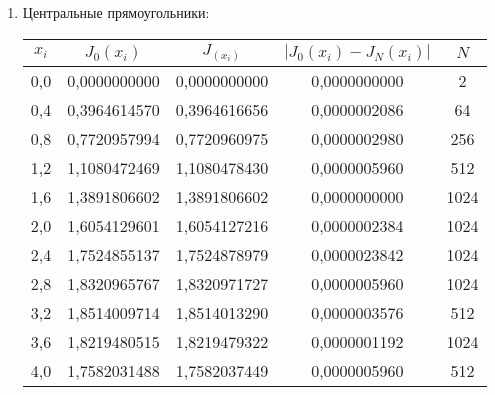 \documentclass[a4paper,12pt]{article}
\begin{document}
{\begin{enumerate}[label = \arabic*.]
{\begin{table}[h]
\begin{tabular}{|c|c|c|c|c|}
          \end{tabular}
          \caption*{\small{Таблица 2 - таблица значений для формулы правых прямоугольников}}
        \end{table}
    }
    \item {Центральные прямоугольники:
        \begin{table}[h]
          \centering
          \begin{tabular}{|c|c|c|c|c|}
            \hline
            $x_i$ & $J_0(x_i)$ & $J_(x_i)$ & $\left|J_0(x_i) - J_N(x_i)\right|$ & $N$\\
            \hline
            0,0 & 0,0000000000 & 0,0000000000 & 0,0000000000 & 2 \\
            \hline
            0,4 & 0,3964614570 & 0,3964616656 & 0,0000002086 & 64 \\
            \hline
            0,8 & 0,7720957994 & 0,7720960975 & 0,0000002980 & 256 \\
            \hline
            1,2 & 1,1080472469 & 1,1080478430 & 0,0000005960 & 512 \\
            \hline
            1,6 & 1,3891806602 & 1,3891806602 & 0,0000000000 & 1024 \\
            \hline
            2,0 & 1,6054129601 & 1,6054127216 & 0,0000002384 & 1024 \\
            \hline
            2,4 & 1,7524855137 & 1,7524878979 & 0,0000023842 & 1024 \\
            \hline
            2,8 & 1,8320965767 & 1,8320971727 & 0,0000005960 & 1024 \\
            \hline
            3,2 & 1,8514009714 & 1,8514013290 & 0,0000003576 & 512 \\
            \hline
            3,6 & 1,8219480515 & 1,8219479322 & 0,0000001192 & 1024 \\
            \hline
            4,0 & 1,7582031488 & 1,7582037449 & 0,0000005960 & 512 \\
            \hline


\end{tabular}
\end{table}}
\end{enumerate}}
\end{document}
